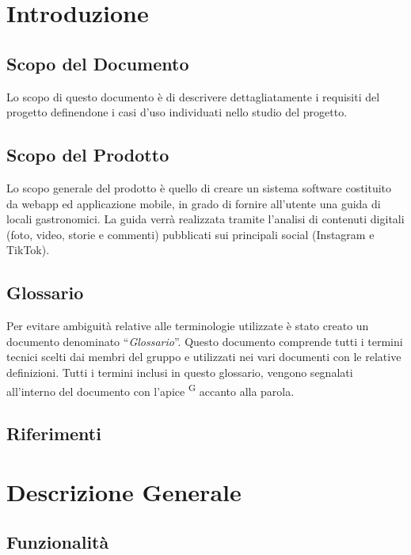 \documentclass[letterpaper]{article}
\begin{document}
\pagebreak

\renewcommand{\contentsname}{Indice}
\tableofcontents
\pagebreak

\section{Introduzione}

\subsection{Scopo del Documento}
Lo scopo di questo documento è di descrivere dettagliatamente i requisiti del progetto definendone i casi d’uso individuati nello studio del progetto.

\subsection{Scopo del Prodotto}

Lo scopo generale del prodotto è quello di creare un sistema software costituito da webapp ed applicazione mobile, in grado di fornire all’utente una guida di locali gastronomici. La guida verrà realizzata tramite l’analisi di contenuti digitali (foto, video, storie e commenti) pubblicati sui principali social (Instagram e TikTok). 

\subsection{Glossario}

Per evitare ambiguità relative alle terminologie utilizzate è stato creato un documento denominato “\textit{Glossario}”. Questo documento comprende tutti i termini tecnici scelti dai membri del gruppo e utilizzati nei vari documenti con le relative definizioni. Tutti i termini inclusi in questo glossario, vengono segnalati all’interno del documento con l’apice \textsuperscript{G} accanto alla parola.

\subsection{Riferimenti}

\section{Descrizione Generale}

\subsection{Funzionalità}
\end{document}
